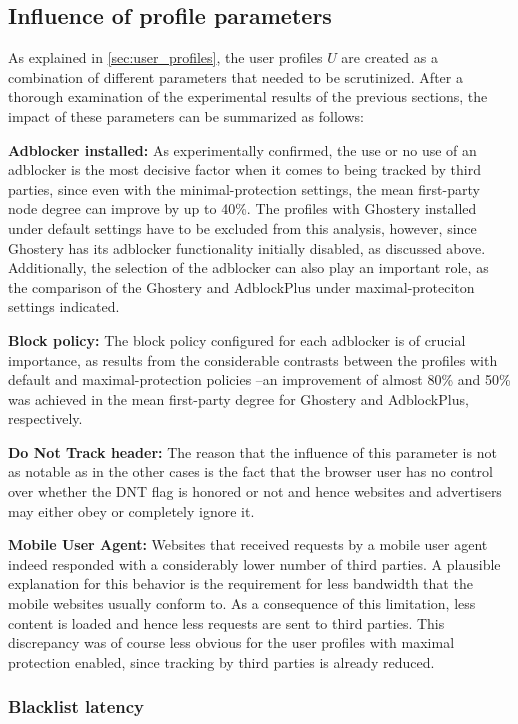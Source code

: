 \documentclass{sig-alternate}
\begin{document}
\subsection{Influence of profile parameters}
{\color{blue}
As explained in \ref{sec:user_profiles}, the user profiles $U$ are created as a combination of different parameters that needed to be scrutinized. After a thorough examination of the experimental results of the previous sections, the impact of these parameters can be summarized as follows:

\textbf{Adblocker installed:} As experimentally confirmed, the use or no use of an adblocker is the most decisive factor when it comes to being tracked by third parties, since even with the minimal-protection settings, the mean first-party node degree can improve by up to 40\%. The profiles with Ghostery installed under default settings have to be excluded from this analysis, however, since Ghostery has its adblocker functionality initially disabled, as discussed above. Additionally, the selection of the adblocker can also play an important role, as the comparison of the Ghostery and AdblockPlus under maximal-proteciton settings indicated.

\textbf{Block policy:} The block policy configured for each adblocker is of crucial importance, as results from the considerable contrasts between the profiles with default and maximal-protection policies --an improvement of almost 80\% and 50\% was achieved in the mean first-party degree for Ghostery and AdblockPlus, respectively.

\textbf{Do Not Track header:} The reason that the influence of this parameter is not as notable as in the other cases is the fact that the browser user has no control over whether the DNT flag is honored or not and hence websites and advertisers may either obey or completely ignore it.

\textbf{Mobile User Agent:} Websites that received requests by a mobile user agent indeed responded with a considerably lower number of third parties. A plausible explanation for this behavior is the requirement for less bandwidth that the mobile websites usually conform to. As a consequence of this limitation, less content is loaded and hence less requests are sent to third parties. This discrepancy was of course less obvious for the user profiles with maximal protection enabled, since tracking by third parties is already reduced.
}

\subsubsection{Blacklist latency}
\end{document}
